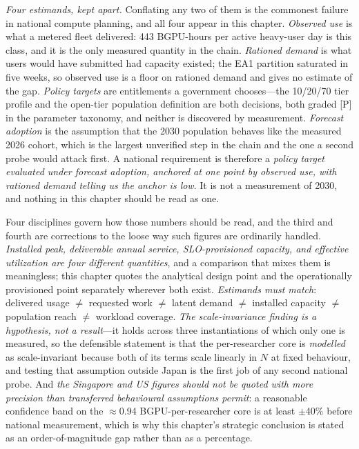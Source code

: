 \emph{Four estimands, kept apart.} Conflating any two of them is the commonest failure in national compute planning, and all four appear in this chapter. \emph{Observed use} is what a metered fleet delivered: 443 BGPU-hours per active heavy-user day is this class, and it is the only measured quantity in the chain. \emph{Rationed demand} is what users would have submitted had capacity existed; the EA1 partition saturated in five weeks, so observed use is a floor on rationed demand and gives no estimate of the gap. \emph{Policy targets} are entitlements a government chooses---the 10/20/70 tier profile and the open-tier population definition are both decisions, both graded [P] in the parameter taxonomy, and neither is discovered by measurement. \emph{Forecast adoption} is the assumption that the 2030 population behaves like the measured 2026 cohort, which is the largest unverified step in the chain and the one a second probe would attack first. A national requirement is therefore a \emph{policy target evaluated under forecast adoption, anchored at one point by observed use, with rationed demand telling us the anchor is low}. It is not a measurement of 2030, and nothing in this chapter should be read as one.

Four disciplines govern how those numbers should be read, and the third and fourth are corrections to the loose way such figures are ordinarily handled. \emph{Installed peak, deliverable annual service, SLO-provisioned capacity, and effective utilization are four different quantities}, and a comparison that mixes them is meaningless; this chapter quotes the analytical design point and the operationally provisioned point separately wherever both exist. \emph{Estimands must match}: delivered usage $\ne$ requested work $\ne$ latent demand $\ne$ installed capacity $\ne$ population reach $\ne$ workload coverage. \emph{The scale-invariance finding is a hypothesis, not a result}---it holds across three instantiations of which only one is measured, so the defensible statement is that the per-researcher core is \emph{modelled} as scale-invariant because both of its terms scale linearly in $N$ at fixed behaviour, and testing that assumption outside Japan is the first job of any second national probe. And \emph{the Singapore and US figures should not be quoted with more precision than transferred behavioural assumptions permit}: a reasonable confidence band on the $\approx$0.94 BGPU-per-researcher core is at least $\pm$40\% before national measurement, which is why this chapter's strategic conclusion is stated as an order-of-magnitude gap rather than as a percentage.

